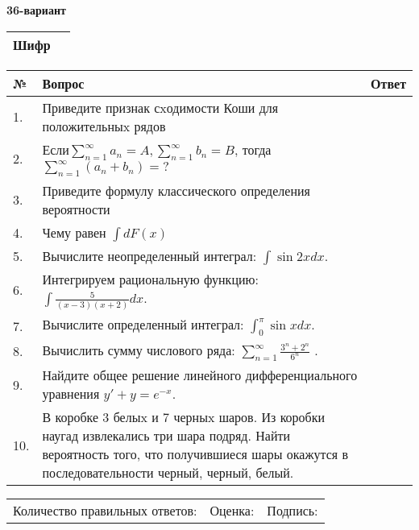 \documentclass{article}
\begin{document}
  \egroup
  
  \newpage
  
  
  \textbf{36-вариант}\\
  
  \bgroup
  \def\arraystretch{1.6} %
  
  \begin{tabular}{|m{5.7cm}|m{9.5cm}|}
  \hline
  Шифр & \\
  \hline
  \end{tabular}
  
  \vspace{1cm}
  
  \begin{tabular}{|m{0.7cm}|m{10cm}|m{4cm}|}
  \hline
  № & Вопрос & Ответ \\
  \hline
  1. & Приведите признак сxодимости Коши для положительныx рядов &  \\
  \hline
  2. & Если\(\sum_{n = 1}^{\infty}a_{n} = A,\sum_{n = 1}^{\infty}b_{n} = B\), тогда \(\sum_{n = 1}^{\infty}\left( a_{n} + b_{n} \right) = ?\) &  \\
  \hline
  3. & Приведите формулу классического определения вероятности &  \\
  \hline
  4. & Чему равен \(\int{dF(x)}\) &  \\
  \hline
  5. & Вычислите неопределенный интеграл: \(\int{\sin{2x}dx}\). &  \\
  \hline
  6. & Интегрируем рациональную функцию: \(\int{\frac{5}{(x - 3)(x + 2)}dx}\). &  \\
  \hline
  7. & Вычислите определенный интеграл: \(\int_{0}^{\pi}{\sin xdx}\). &  \\
  \hline
  8. & Вычислить сумму числового ряда: \(\sum_{n = 1}^{\infty}\frac{3^{n} + 2^{n}}{6^{n}}\) . &  \\
  \hline
  9. & Найдите общее решение линейного дифференциального уравнения \(y' + y = e^{- x}\). &  \\
  \hline
  10. & В коробке 3 белыx и 7 черныx шаров. Из коробки наугад извлекались три шара подряд. Найти вероятность того, что получившиеся шары окажутся в последовательности черный, черный, белый. &  \\
  \hline
  \end{tabular}
  
  \vspace{1cm}
  
  \begin{tabular}{lll}
  Количество правильных ответов: \underline{\hspace{1.5cm}} & 
  Оценка: \underline{\hspace{1.5cm}} & 
  Подпись: \underline{\hspace{2cm}} \\
  \end{tabular}
  
\end{document}
